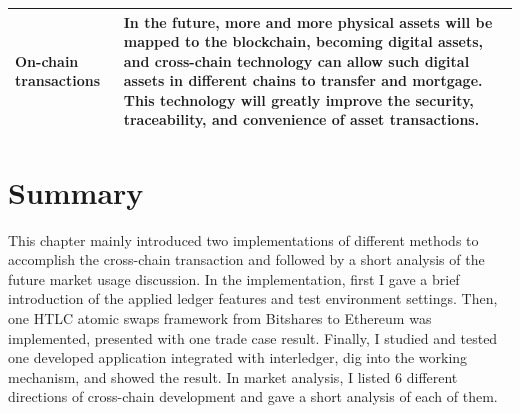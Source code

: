 \begin{longtable}{l|p{7cm}}
\midrule
On-chain transactions & In the future, more and more physical assets will be mapped to the blockchain, becoming digital assets, and cross-chain technology can allow such digital assets in different chains to transfer and mortgage. This technology will greatly improve the security, traceability, and convenience of asset transactions.\\
\bottomrule


\end{longtable}


\section{Summary}
\label{sec:sum4}
\noindent This chapter mainly introduced two implementations of different methods to accomplish the cross-chain transaction and followed by a short analysis of the future market usage discussion. In the implementation, first I gave a brief introduction of the applied ledger features and test environment settings. Then, one HTLC atomic swaps framework from Bitshares to Ethereum was implemented, presented with one trade case result. Finally, I studied and tested one developed application integrated with interledger, dig into the working mechanism, and showed the result. In market analysis, I listed 6 different directions of cross-chain development and gave a short analysis of each of them.
